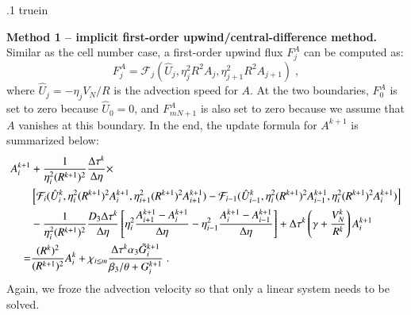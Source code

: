 \documentclass{amsart}
\theoremstyle{definition}
\theoremstyle{remark}
\numberwithin{equation}{section}
\numberwithin{figure}{section}
\begin{document}
\vglue .1 truein

\noindent
{\bf Method 1 -- implicit first-order upwind/central-difference method.}
Similar as the cell number case, a first-order upwind flux $F_j^A$ can be computed as:
\begin{displaymath}
F_j^A = \mathcal{F}_j(\hat{U}_j,\eta_j^2R^2A_j,\eta_{j+1}^2R^2A_{j+1})\;,
\end{displaymath}
where $\hat{U}_j=-\eta_jV_N/R$ is the advection speed for $A$.
At the two boundaries, $F_0^A$ is set to zero because $\hat{U}_0=0$, and $F_{mN+1}^A$ is also set to zero because we assume that $A$ vanishes at this boundary.
In the end, the update formula for $A^{k+1}$ is summarized below:
\begin{align}
\label{eq:num_im_upw_chem}
A_i^{k+1} &+ \frac{1}{\eta_i^2(R^{k+1})^2}\frac{\Delta\tau^k}{\Delta\eta}\times \\ 
\notag
&\left[\mathcal{F}_i(\hat{U}_i^k,\eta_i^2(R^{k+1})^2A_i^{k+1},\eta_{i+1}^2(R^{k+1})^2A_{i+1}^{k+1})-\mathcal{F}_{i-1}(\hat{U}_{i-1}^k,\eta_i^2(R^{k+1})^2A_{i-1}^{k+1},\eta_i^2(R^{k+1})^2A_i^{k+1})\right] \\
\notag
&-\frac{1}{\eta_i^2(R^{k+1})^2}\frac{D_3\Delta\tau^k}{\Delta\eta}\left[\eta_i^2\frac{A_{i+1}^{k+1}-A_i^{k+1}}{\Delta\eta}-\eta_{i-1}^2\frac{A_i^{k+1}-A_{i-1}^{k+1}}{\Delta\eta}\right] + \Delta\tau^k\left(\gamma+\frac{V_N^k}{R^k}\right)A_i^{k+1} \\
\notag
= & \frac{(R^k)^2}{(R^{k+1})^2}A_i^k + \chi_{i\le m}\frac{\Delta\tau^k \alpha_3\tilde{G}_i^{k+1}}{\beta_3/\theta+G_i^{k+1}}\;.
\end{align}
Again, we froze the advection velocity so that only a linear system needs to be solved.
\end{document}
